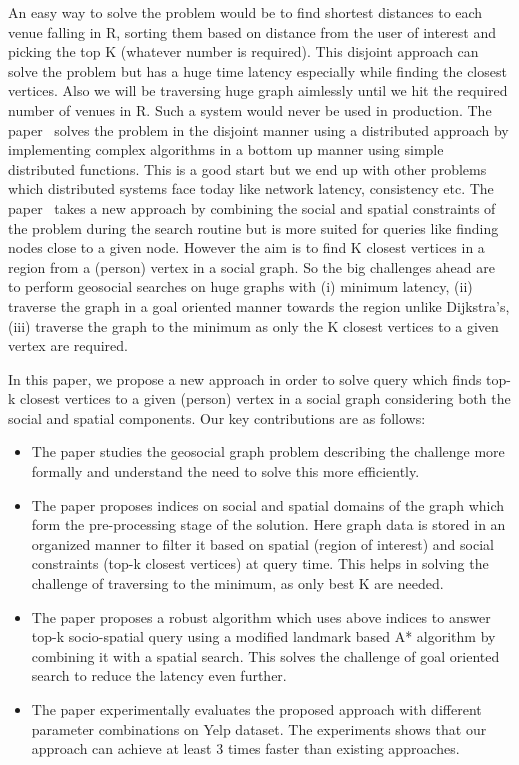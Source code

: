 An easy way to solve the problem would be to find shortest distances to each venue falling in R, sorting them based on distance from the user of interest and picking the top K (whatever number is required). This disjoint approach can solve the problem but has a huge time latency especially while finding the closest vertices. Also we will be traversing huge graph aimlessly until we hit the required number of venues in R. Such a system would never be used in production. The paper~\cite{NSD2013} solves the problem in the disjoint manner using a distributed approach by implementing complex algorithms in a bottom up manner using simple distributed functions. This is a good start but we end up with other problems which distributed systems face today like network latency, consistency etc. The paper~\cite{KJY+2015} takes a new approach by combining the social and spatial constraints of the problem during the search routine but is more suited for queries like finding nodes close to a given node. However the aim is to find K closest vertices in a region from a (person) vertex in a social graph. So the big challenges ahead are to perform geosocial searches on huge graphs with (i) minimum latency, (ii) traverse the graph in a goal oriented manner towards the region unlike Dijkstra's, (iii) traverse the graph to the minimum as only the K closest vertices to a given vertex are required.

In this paper, we propose a new approach {\rrp} in order to solve {\query} query which finds top-k closest vertices to a given (person) vertex in a social graph considering both the social and spatial components. Our key contributions are as follows:
\begin{itemize}
	\item The paper studies the geosocial graph problem describing the challenge more formally and understand the need to solve this more efficiently.
	\item The paper proposes indices on social and spatial domains of the graph which form the pre-processing stage of the solution. Here graph data is stored in an organized manner to filter it based on spatial (region of interest) and social constraints (top-k closest vertices) at query time. This helps in solving the challenge of traversing to the minimum, as only best K are needed.
	\item The paper proposes a robust algorithm which uses above indices to answer top-k socio-spatial query using a modified landmark based A* algorithm by combining it with a spatial search. This solves the challenge of goal oriented search to reduce the latency even further.
	\item The paper experimentally evaluates the proposed approach with different parameter combinations on Yelp dataset. The experiments shows that our approach can achieve at least 3 times faster than existing approaches.
\end{itemize}

